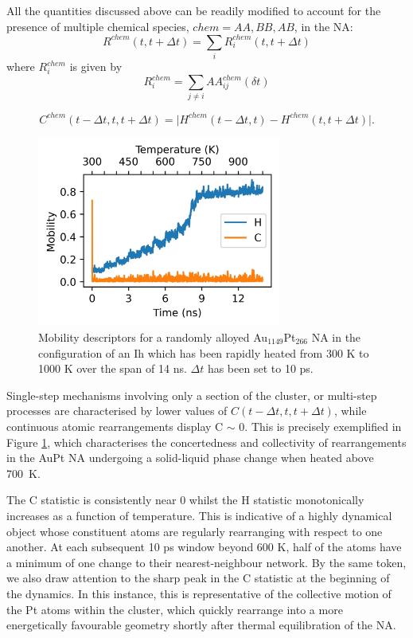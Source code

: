 All the quantities discussed above can be readily modified to account for the presence of multiple
chemical species, $chem = AA, BB, AB$, in the NA:
\begin{equation}
R^{chem}(t, t + \Delta  t) = \sum_i R^{chem}_{i} (t, t + \Delta t) 
\end{equation}
where $R^{chem}_{i}$ is given by
\begin{equation}
R^{chem}_{i} = \sum_{j \ne i} AA_{ij}^{chem} (\delta t)
\end{equation}

\begin{equation}
    C^{chem} \left( t - \Delta t, t, t + \Delta t \right) = \vert H^{chem} \left( t - \Delta t, t \right) - H^{chem}\left( t, t + \Delta t \right) \vert .
\end{equation}

\begin{figure}[ht!]
    \centering
    \includegraphics[width = 8cm]{figures/Sapphire/Mobility.jpeg}
    \caption{Mobility descriptors for a randomly alloyed Au$_{1149}$Pt$_{266}$ NA in the configuration of an Ih which has been rapidly heated from 300 K to 1000 K over the span of 14 ns. $\Delta t$ has been set to 10 ps.}
    \label{fig:Mobility}
\end{figure}

Single-step mechanisms involving only a section of the cluster, or multi-step processes are characterised by lower values of $C\left(t  - \Delta t, t, t + \Delta t \right)$, while continuous atomic rearrangements display C $\sim$ 0. 
This is precisely exemplified in Figure \ref{fig:Mobility}, which characterises the concertedness and collectivity of rearrangements in the AuPt NA undergoing a solid-liquid phase change when heated above 700~K.

The C statistic is consistently near 0 whilst the H statistic monotonically increases as a function of temperature. 
This is indicative of a highly dynamical object whose constituent atoms are regularly rearranging with respect to one another.
At each subsequent 10 ps window beyond 600 K, half of the atoms have a minimum of one change to their nearest-neighbour network. 
By the same token, we also draw attention to the sharp peak in the C statistic at the beginning of the dynamics. 
%
In this instance, this is representative of the collective motion of the Pt atoms within the cluster, which quickly rearrange into a more energetically favourable geometry shortly after thermal equilibration of the NA.

